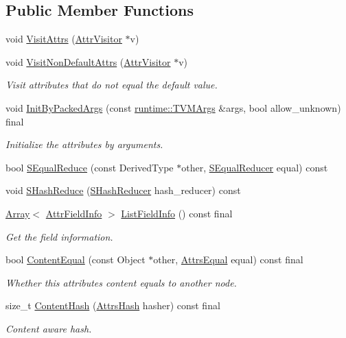 \subsection*{Public Member Functions}
\begin{DoxyCompactItemize}
\item 
void \hyperlink{classtvm_1_1AttrsNode_a5da687ced06b4f2dfa04b142a34a9c72}{Visit\+Attrs} (\hyperlink{classtvm_1_1AttrVisitor}{Attr\+Visitor} $\ast$v)
\item 
void \hyperlink{classtvm_1_1AttrsNode_acd05137ba529ac7cd07053e3da885205}{Visit\+Non\+Default\+Attrs} (\hyperlink{classtvm_1_1AttrVisitor}{Attr\+Visitor} $\ast$v)
\begin{DoxyCompactList}\small\item\em Visit attributes that do not equal the default value. \end{DoxyCompactList}\item 
void \hyperlink{classtvm_1_1AttrsNode_acfba199ef906818f35432d2e5532559a}{Init\+By\+Packed\+Args} (const \hyperlink{classtvm_1_1runtime_1_1TVMArgs}{runtime\+::\+T\+V\+M\+Args} \&args, bool allow\+\_\+unknown) final
\begin{DoxyCompactList}\small\item\em Initialize the attributes by arguments. \end{DoxyCompactList}\item 
bool \hyperlink{classtvm_1_1AttrsNode_af8192054af4e2797953cc7b67625092f}{S\+Equal\+Reduce} (const Derived\+Type $\ast$other, \hyperlink{classtvm_1_1SEqualReducer}{S\+Equal\+Reducer} equal) const 
\item 
void \hyperlink{classtvm_1_1AttrsNode_ad6cc4d8a955e30b9f55c0b5367ccce38}{S\+Hash\+Reduce} (\hyperlink{classtvm_1_1SHashReducer}{S\+Hash\+Reducer} hash\+\_\+reducer) const 
\item 
\hyperlink{classtvm_1_1Array}{Array}$<$ \hyperlink{classtvm_1_1AttrFieldInfo}{Attr\+Field\+Info} $>$ \hyperlink{classtvm_1_1AttrsNode_acefe615381b5d881870af9db7ce6a981}{List\+Field\+Info} () const final
\begin{DoxyCompactList}\small\item\em Get the field information. \end{DoxyCompactList}\item 
bool \hyperlink{classtvm_1_1AttrsNode_a7f609d3a1b52df0b442793f043cc49ae}{Content\+Equal} (const Object $\ast$other, \hyperlink{classtvm_1_1AttrsEqual}{Attrs\+Equal} equal) const final
\begin{DoxyCompactList}\small\item\em Whether this attribute\textquotesingle{}s content equals to another node. \end{DoxyCompactList}\item 
size\+\_\+t \hyperlink{classtvm_1_1AttrsNode_abe3e0fd8559c5d446a136490d4dbee12}{Content\+Hash} (\hyperlink{classtvm_1_1AttrsHash}{Attrs\+Hash} hasher) const final
\begin{DoxyCompactList}\small\item\em Content aware hash. \end{DoxyCompactList}\end{DoxyCompactItemize}
